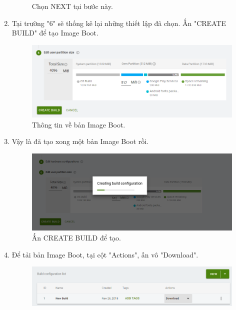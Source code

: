 \begin{enumerate}
\begin{center}
\begin{figure}[htp]
\begin{center}
\end{center}
\caption{Chọn NEXT tại bước này.}
\label{refhinh1}
\end{figure}
\end{center}
\item Tại trường "6" sẽ thống kê lại những thiết lập đã chọn. Ấn "CREATE BUILD" để tạo Image Boot.
\begin{center}
\begin{figure}[htp]
\begin{center}
\includegraphics[scale=0.6]{image3/sat13.png}
\end{center}
\caption{Thông tin về bản Image Boot.}
\label{refhinh1}
\end{figure}
\end{center}
\newpage
\item Vậy là đã tạo xong một bản Image Boot rồi.
\begin{center}
\begin{figure}[htp]
\begin{center}
\includegraphics[scale=0.45]{image3/sat14.png}
\end{center}
\caption{Ấn CREATE BUILD để tạo.}
\label{refhinh1}
\end{figure}
\end{center}
\item Để tải bản Image Boot, tại cột "Actions", ấn vô "Download".
\begin{center}
\begin{figure}[htp]
\begin{center}
\includegraphics[scale=0.52]{image3/sat17.png}

\end{center}
\end{figure}
\end{center}
\end{enumerate}
